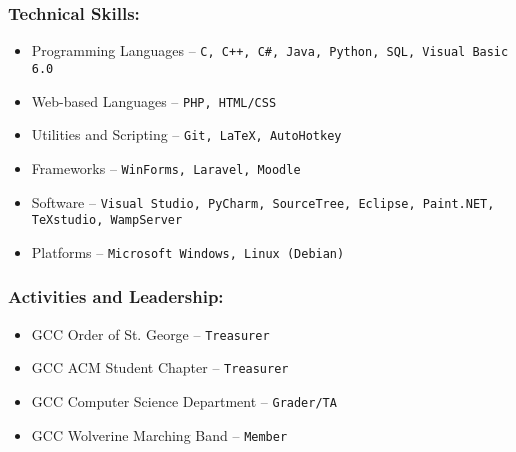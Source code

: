\documentclass[12pt]{article}
\theoremstyle{plain} %
\theoremstyle{definition} %
\begin{document}
\subsubsection*{\color{head}Technical Skills:}
\begin{itemize}
	\item {\color{accent} Programming Languages} -- \texttt{C, C++, C\#, Java, Python, SQL, Visual Basic 6.0}
	\item {\color{accent} Web-based Languages} -- \texttt{PHP, HTML/CSS}
	\item {\color{accent} Utilities and Scripting} -- \texttt{Git, LaTeX, AutoHotkey}
	\item {\color{accent} Frameworks} -- \texttt{WinForms, Laravel, Moodle}
	\item {\color{accent} Software} -- \texttt{Visual Studio, PyCharm, SourceTree, Eclipse, Paint.NET, TeXstudio, WampServer}
	\item {\color{accent} Platforms} -- \texttt{Microsoft Windows, Linux (Debian)}
\end{itemize}

\subsubsection*{\color{head}Activities and Leadership:}
\begin{itemize}
	\item {\color{accent} GCC Order of St. George} -- \texttt{Treasurer}
	\item {\color{accent} GCC ACM Student Chapter} -- \texttt{Treasurer}
	\item {\color{accent} GCC Computer Science Department} -- \texttt{Grader/TA}
	\item {\color{accent} GCC Wolverine Marching Band} -- \texttt{Member}
\end{itemize}
\end{document}
